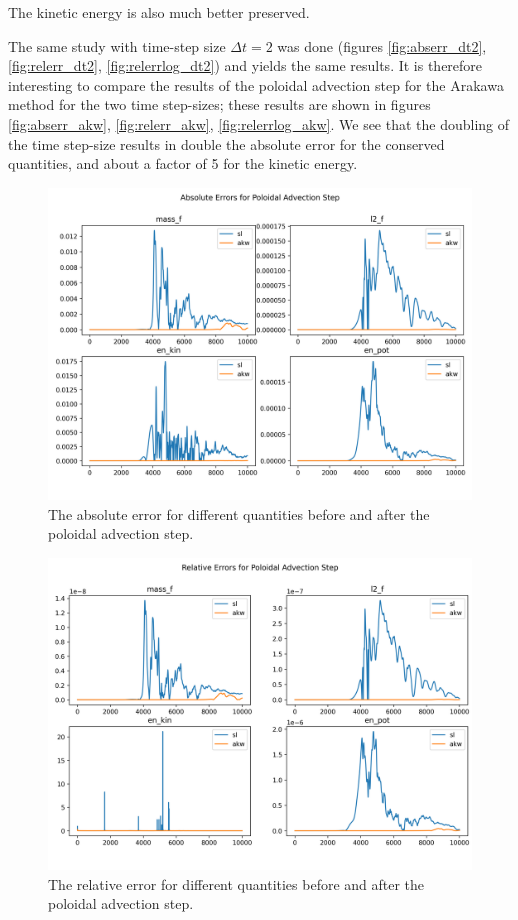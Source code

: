 The kinetic energy is also much better preserved.

The same study with time-step size $\Delta t = 2$ was done (figures \ref{fig:abserr_dt2}, \ref{fig:relerr_dt2}, \ref{fig:relerrlog_dt2}) and yields the same results. It is therefore interesting to compare the results of the poloidal advection step for the Arakawa method for the two time step-sizes; these results are shown in figures \ref{fig:abserr_akw}, \ref{fig:relerr_akw}, \ref{fig:relerrlog_akw}. We see that the doubling of the time step-size results in double the absolute error for the conserved quantities, and about a factor of 5 for the kinetic energy.

\begin{figure}
	\centering
	\includegraphics[width=0.9\linewidth]{plots/abs_err}
	\caption{The absolute error for different quantities before and after the poloidal advection step.}
	\label{fig:abserr}
\end{figure}


\begin{figure}
	\centering
	\includegraphics[width=0.9\linewidth]{plots/rel_err}
	\caption{The relative error for different quantities before and after the poloidal advection step.}
	\label{fig:relerr}
\end{figure}


